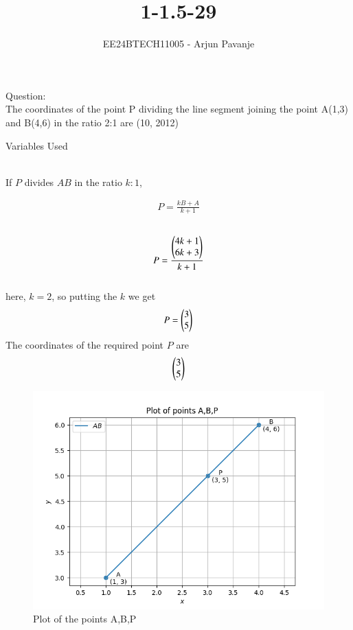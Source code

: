 \documentclass[journal]{IEEEtran}
\begin{document}

\vspace{3cm}

\title{1-1.5-29}
\author{EE24BTECH11005 - Arjun Pavanje
}
{\let\newpage\relax\maketitle}
Question:\\
The coordinates of the point P dividing the line segment joining the point A(1,3) and B(4,6) in the ratio 2:1 are
\hfill (10, 2012)
\\
\solution
\begin{table}[h!]    
  \centering
  
  \caption{Variables Used}
  \label{tab1-1.5-29}
\end{table}\\
If $P$ divides $AB$ in the ratio $k:1$,


\begin{align} 
P=\frac{kB+A}{k+1} 
\end{align}\\
\begin{align}
	P = \frac{\begin{pmatrix}
4k+1 \\
6k+3
\end{pmatrix}}{k+1} 
\end{align}\\
here, $k = 2$, so putting the $k$ we get
\begin{align}
P = 
\begin{pmatrix}
3\\
5
\end{pmatrix}
\end{align}
The coordinates of the required point $P$ are
\begin{align}
\begin{pmatrix}
3\\
5
\end{pmatrix}
\end{align}
\begin{figure}[h!]
   \centering
   \includegraphics[width=0.7\linewidth]{figs/Figure_1.png}
   \caption{Plot of the points A,B,P}
   \label{stemplot}
\end{figure}
\end{document}
